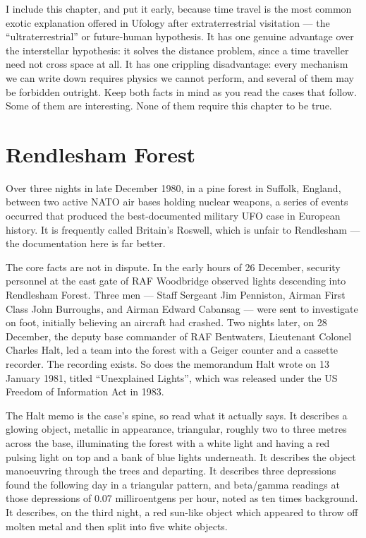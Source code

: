 I include this chapter, and put it early, because time travel is the most common exotic
explanation offered in Ufology after extraterrestrial visitation --- the ``ultraterrestrial''
or future-human hypothesis. It has one genuine advantage over the interstellar hypothesis:
it solves the distance problem, since a time traveller need not cross space at all. It has
one crippling disadvantage: every mechanism we can write down requires physics we cannot
perform, and several of them may be forbidden outright. Keep both facts in mind as you read
the cases that follow. Some of them are interesting. None of them require this chapter to
be true.

\section{Rendlesham Forest}\label{sec:rendlesham}

Over three nights in late December 1980, in a pine forest in Suffolk, England, between two
active NATO air bases holding nuclear weapons, a series of events occurred that produced
the best-documented military UFO case in European history. It is frequently called
Britain's Roswell, which is unfair to Rendlesham --- the documentation here is far better.

The core facts are not in dispute. In the early hours of 26 December, security personnel at
the east gate of RAF Woodbridge observed lights descending into Rendlesham Forest. Three
men --- Staff Sergeant Jim Penniston, Airman First Class John Burroughs, and Airman Edward
Cabansag --- were sent to investigate on foot, initially believing an aircraft had crashed.
Two nights later, on 28 December, the deputy base commander of RAF Bentwaters, Lieutenant
Colonel Charles Halt, led a team into the forest with a Geiger counter and a cassette
recorder. The recording exists. So does the memorandum Halt wrote on 13 January 1981,
titled ``Unexplained Lights'', which was released under the US Freedom of Information Act
in 1983.

The Halt memo is the case's spine, so read what it actually says. It describes a glowing
object, metallic in appearance, triangular, roughly two to three metres across the base,
illuminating the forest with a white light and having a red pulsing light on top and a bank
of blue lights underneath. It describes the object manoeuvring through the trees and
departing. It describes three depressions found the following day in a triangular pattern,
and beta/gamma readings at those depressions of 0.07 milliroentgens per hour, noted as ten
times background. It describes, on the third night, a red sun-like object which appeared to
throw off molten metal and then split into five white objects.

